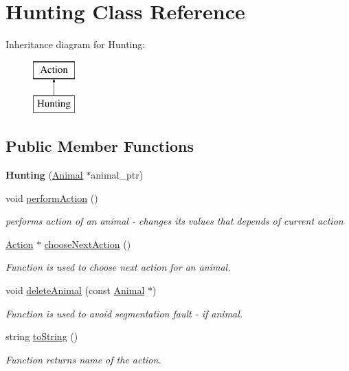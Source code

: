 \hypertarget{class_hunting}{}\section{Hunting Class Reference}
\label{class_hunting}
Inheritance diagram for Hunting\+:\begin{figure}[H]
\begin{center}
\leavevmode
\includegraphics[height=2.000000cm]{class_hunting}
\end{center}
\end{figure}
\subsection*{Public Member Functions}
\begin{DoxyCompactItemize}
\item 
\hypertarget{class_hunting_a21ff73dcae6aa8d18edd3134939cd7a9}{}{\bfseries Hunting} (\hyperlink{class_animal}{Animal} $\ast$animal\+\_\+ptr)\label{class_hunting_a21ff73dcae6aa8d18edd3134939cd7a9}

\item 
void \hyperlink{class_hunting_ab794e2cd49dd525b8d994d24fe7dc7ee}{perform\+Action} ()
\begin{DoxyCompactList}\small\item\em performs action of an animal -\/ changes it\textquotesingle{}s values that depends of current action \end{DoxyCompactList}\item 
\hyperlink{class_action}{Action} $\ast$ \hyperlink{class_hunting_a40b8bea137bb08979f6afd70a981cde0}{choose\+Next\+Action} ()
\begin{DoxyCompactList}\small\item\em Function is used to choose next action for an animal. \end{DoxyCompactList}\item 
void \hyperlink{class_hunting_af1736450c4ff7f8397d58e0b7aae0fa4}{delete\+Animal} (const \hyperlink{class_animal}{Animal} $\ast$)
\begin{DoxyCompactList}\small\item\em Function is used to avoid segmentation fault -\/ if animal. \end{DoxyCompactList}\item 
string \hyperlink{class_hunting_a00f665db30936ce7a96d860bd7e952a4}{to\+String} ()
\begin{DoxyCompactList}\small\item\em Function returns name of the action. \end{DoxyCompactList}\end{DoxyCompactItemize}
